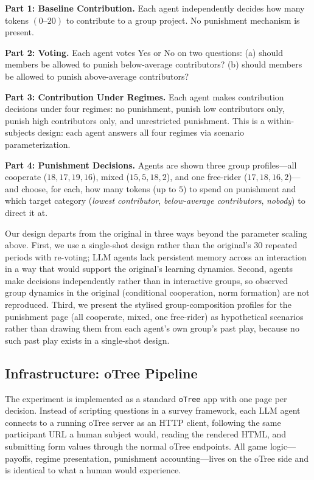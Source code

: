 \documentclass[12pt, a4paper]{article}
\begin{document}
\textbf{Part 1: Baseline Contribution.} Each agent independently decides how many tokens $(0\text{--}20)$ to contribute to a group project. No punishment mechanism is present.

\textbf{Part 2: Voting.} Each agent votes Yes or No on two questions: (a) should members be allowed to punish below-average contributors? (b) should members be allowed to punish above-average contributors?

\textbf{Part 3: Contribution Under Regimes.} Each agent makes contribution decisions under four regimes: no punishment, punish low contributors only, punish high contributors only, and unrestricted punishment. This is a within-subjects design: each agent answers all four regimes via scenario parameterization.

\textbf{Part 4: Punishment Decisions.} Agents are shown three group profiles---all cooperate ($18, 17, 19, 16$), mixed ($15, 5, 18, 2$), and one free-rider ($17, 18, 16, 2$)---and choose, for each, how many tokens (up to $5$) to spend on punishment and which target category (\emph{lowest contributor}, \emph{below-average contributors}, \emph{nobody}) to direct it at.

Our design departs from the original in three ways beyond the parameter scaling above. First, we use a single-shot design rather than the original's $30$ repeated periods with re-voting; LLM agents lack persistent memory across an interaction in a way that would support the original's learning dynamics. Second, agents make decisions independently rather than in interactive groups, so observed group dynamics in the original (conditional cooperation, norm formation) are not reproduced. Third, we present the stylised group-composition profiles for the punishment page (all cooperate, mixed, one free-rider) as hypothetical scenarios rather than drawing them from each agent's own group's past play, because no such past play exists in a single-shot design.

\subsection{Infrastructure: oTree Pipeline}

The experiment is implemented as a standard \texttt{oTree} app \citep{otree} with one page per decision. Instead of scripting questions in a survey framework, each LLM agent connects to a running oTree server as an HTTP client, following the same participant URL a human subject would, reading the rendered HTML, and submitting form values through the normal oTree endpoints. All game logic---payoffs, regime presentation, punishment accounting---lives on the oTree side and is identical to what a human would experience.
\end{document}
